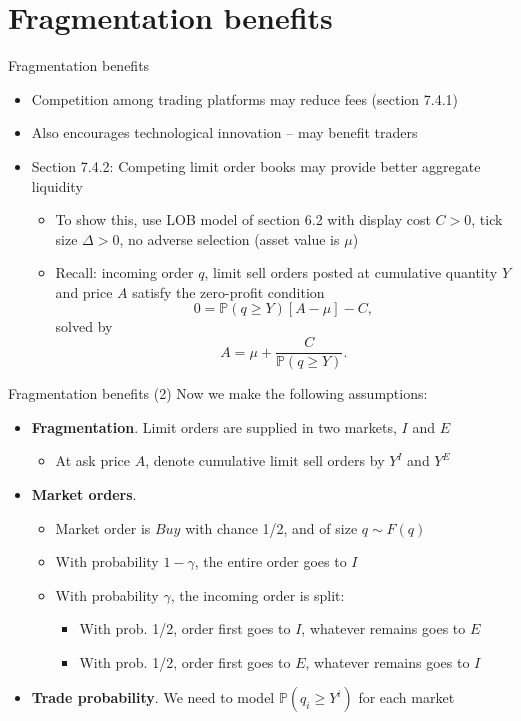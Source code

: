 \documentclass[english,10pt
,aspectratio=169
]{beamer}
\begin{document}
\section{Fragmentation benefits}

\begin{frame}{Fragmentation benefits}
\begin{itemize}
\item Competition among trading platforms may reduce fees (section 7.4.1)
\item Also encourages technological innovation --  may benefit traders
\item Section 7.4.2: Competing limit order books may provide better aggregate liquidity
\begin{itemize}
\item To show this, use LOB model of section 6.2 with display cost $C>0$, tick size $\Delta >0$, no adverse selection (asset value is $\mu$)
\item Recall: incoming order $q$, limit sell orders posted at cumulative quantity $Y$ and price $A$ satisfy the zero-profit condition
\[
0 = \mathbb{P}(q \geq Y)[A-\mu]-C,
\]
solved by 
\begin{equation} \tag{6.7}
A= \mu + \frac{C}{\mathbb{P}(q \geq Y)}.
\end{equation}
\end{itemize}
\end{itemize}
\end{frame}


\begin{frame}{Fragmentation benefits (2)}
Now we make the following assumptions:
\begin{itemize}
\item \textbf{Fragmentation}. Limit orders are supplied in two markets, $I$ and $E$
\begin{itemize}
\item At ask price $A$, denote cumulative limit sell orders by $Y^I$ and $Y^E$
\end{itemize}
\item \textbf{Market orders}. 
\begin{itemize}
\item Market order is $Buy$ with chance 1/2, and of size $q \sim F(q)$
\item With probability $1-\gamma$, the entire order goes to $I$
\item With probability $\gamma$, the incoming order is split:
\begin{itemize}
\item With prob. 1/2, order first goes to $I$, whatever remains goes to $E$
\item With prob. 1/2, order first goes to $E$, whatever remains goes to $I$
\end{itemize}
\end{itemize}
\item  \textbf{Trade probability}. We need to model $\mathbb{P}(q_i \geq Y^i)$ for each market
\end{itemize}
\end{frame}
\end{document}
